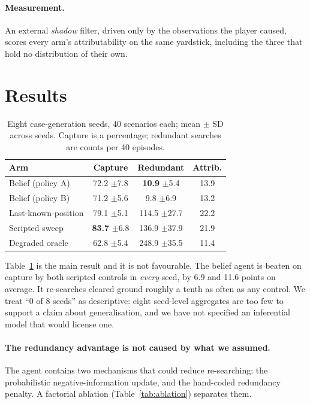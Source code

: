 \documentclass{article}
\begin{document}
\paragraph{Measurement.}
An external \emph{shadow} filter, driven only by the observations the player caused, scores
every arm's attributability on the same yardstick, including the three that hold no
distribution of their own.

\section{Results}
\label{sec:results}

\begin{table}[t]
\centering
\small
\begin{tabular}{@{}lccc@{}}
\toprule
Arm & Capture & Redundant & Attrib. \\
\midrule
Belief (policy A)      & 72.2 \small{$\pm$7.8} & \textbf{10.9} \small{$\pm$5.4} & 13.9 \\
Belief (policy B)      & 71.2 \small{$\pm$5.6} & 9.8 \small{$\pm$6.9}  & 13.2 \\
Last-known-position    & 79.1 \small{$\pm$5.1} & 114.5 \small{$\pm$27.7} & 22.2 \\
Scripted sweep         & \textbf{83.7} \small{$\pm$6.8} & 136.9 \small{$\pm$37.9} & 21.9 \\
Degraded oracle        & 62.8 \small{$\pm$5.4} & 248.9 \small{$\pm$35.5} & 11.4 \\
\bottomrule
\end{tabular}
\caption{Eight case-generation seeds, 40 scenarios each; mean $\pm$ SD across seeds. Capture is
a percentage; redundant searches are counts per 40 episodes.}
\label{tab:main}
\end{table}

Table~\ref{tab:main} is the main result and it is not favourable. The belief agent is beaten on
capture by both scripted controls in \emph{every} seed, by 6.9 and 11.6 points on average. It
re-searches cleared ground roughly a tenth as often as any control. We treat ``0 of 8 seeds''
as descriptive: eight seed-level aggregates are too few to support a claim about
generalisation, and we have not specified an inferential model that would license one.

\paragraph{The redundancy advantage is not caused by what we assumed.}
The agent contains two mechanisms that could reduce re-searching: the probabilistic
negative-information update, and the hand-coded redundancy penalty. A factorial ablation
(Table~\ref{tab:ablation}) separates them.
\end{document}
